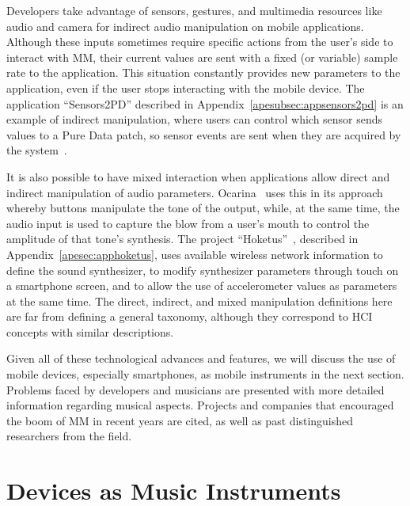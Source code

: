 Developers take advantage of sensors, gestures, and  multimedia resources like audio and camera for indirect audio manipulation on mobile applications.
Although these inputs sometimes require specific actions from the user's side to interact with MM, their current values are sent with a fixed (or variable) sample rate to the application.
This situation constantly provides new parameters to the application, even if the user stops interacting with the mobile device.
The application ``Sensors2PD'' described in Appendix~\ref{apesubsec:appsensors2pd} is an example of indirect manipulation, where users can control which sensor sends values to a Pure Data patch, so sensor events are sent when they are acquired by the system~\citep{deCarvalhoJunior2014sensors2pd}.

It is also possible to have mixed interaction when applications allow direct and indirect manipulation of audio parameters.
Ocarina~\citep{Wang2014ocarina} uses this in its approach whereby buttons manipulate the tone of the output, while, at the same time, the audio input is used to capture the blow from a user's mouth to control the amplitude of that tone's synthesis.
The project ``Hoketus''~\citep{Bandeira2014notes,deCarvalhoJunior2015indoor}, described in Appendix~\ref{apesec:apphoketus}, uses available wireless network information to define the sound synthesizer, to modify synthesizer parameters through touch on a smartphone screen, and to allow the use of accelerometer values as parameters at the same time.
The direct, indirect, and mixed manipulation definitions here are far from defining a general taxonomy, although they correspond to HCI concepts with similar descriptions.

Given all of these technological advances and features, we will discuss the use of mobile devices, especially smartphones, as mobile instruments in the next section.
Problems faced by developers and musicians are presented with more detailed information regarding musical aspects.
Projects and companies that encouraged the boom of MM in recent years are cited, as well as past distinguished researchers from the field.

\section{Devices as Music Instruments}
\label{sec:mobileinstruments}

